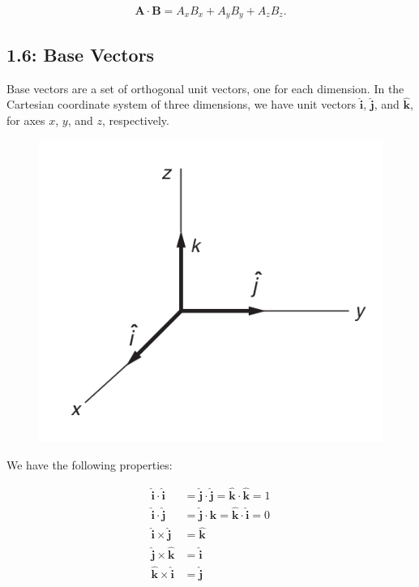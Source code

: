 \documentclass[12pt,twoside]{article}
\begin{document}
\begin{flushleft}
$$
\mathbf{A}\cdot\mathbf{B} = \mathit{A}_{x}\mathit{B}_{x} + \mathit{A}_{y}\mathit{B}_{y} + \mathit{A}_{z}\mathit{B}_{z}.
$$

\subsection*{1.6: Base Vectors}

Base vectors are a set of orthogonal unit vectors, one for each dimension. In the Cartesian coordinate system of three dimensions, we have unit vectors
$\mathbf{\hat{i}}$, $\mathbf{\hat{j}}$, and $\mathbf{\hat{k}}$, for axes $\mathit{x}$, $\mathit{y}$, and $\mathit{z}$, respectively.

\begin{figure}[H]
\includegraphics[scale=.4]{images/chapter1/image2.png}
\centering
\end{figure}

We have the following properties:

\begin{align*}
  \mathbf{\hat{i}}\cdot\mathbf{\hat{i}} &= \mathbf{\hat{j}}\cdot\mathbf{\hat{j}} = \mathbf{\hat{k}}\cdot\mathbf{\hat{k}} = 1 \\
  \mathbf{\hat{i}}\cdot\mathbf{\hat{j}} &= \mathbf{\hat{j}}\cdot\mathbf{\hat{k}} = \mathbf{\hat{k}}\cdot\mathbf{\hat{i}} = 0 \\
  \mathbf{\hat{i}}\times\mathbf{\hat{j}}&= \mathbf{\hat{k}} \\
  \mathbf{\hat{j}}\times\mathbf{\hat{k}}&= \mathbf{\hat{i}} \\
  \mathbf{\hat{k}}\times\mathbf{\hat{i}}&= \mathbf{\hat{j}} \\
\end{align*}


\end{flushleft}
\end{document}
